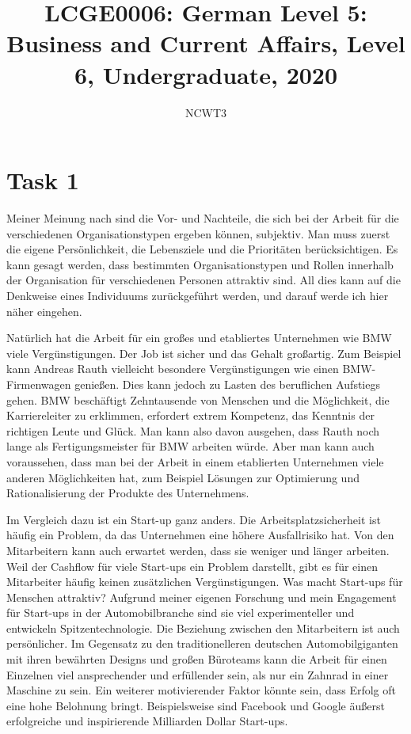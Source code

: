 \documentclass[11pt]{article}
\numberwithin{equation}{section}
\begin{document}
\title{\textbf{LCGE0006: German Level 5: Business and Current Affairs, Level 6, Undergraduate, 2020}}
\author{NCWT3}
\maketitle
\section*{Task 1}
Meiner Meinung nach sind die Vor- und Nachteile, die sich bei der Arbeit für die verschiedenen Organisationstypen ergeben können, subjektiv. Man muss zuerst die eigene Persönlichkeit, die Lebensziele und die Prioritäten berücksichtigen. Es kann gesagt werden, dass bestimmten Organisationstypen und Rollen innerhalb der Organisation für verschiedenen Personen attraktiv sind. All dies kann auf die Denkweise eines Individuums zurückgeführt werden, und darauf werde ich hier näher eingehen.

Natürlich hat die Arbeit für ein großes und etabliertes Unternehmen wie BMW viele Vergünstigungen. Der Job ist sicher und das Gehalt großartig. Zum Beispiel kann Andreas Rauth vielleicht besondere Vergünstigungen wie einen BMW-Firmenwagen genießen. Dies kann jedoch zu Lasten des beruflichen Aufstiegs gehen. BMW beschäftigt Zehntausende von Menschen und die Möglichkeit, die Karriereleiter zu erklimmen, erfordert extrem Kompetenz, das Kenntnis der richtigen Leute und Glück. Man kann also davon ausgehen, dass Rauth noch lange als Fertigungsmeister für BMW arbeiten würde. Aber man kann auch voraussehen, dass man bei der Arbeit in einem etablierten Unternehmen viele anderen Möglichkeiten hat, zum Beispiel Lösungen zur Optimierung und Rationalisierung der Produkte des Unternehmens.

Im Vergleich dazu ist ein Start-up ganz anders. Die Arbeitsplatzsicherheit ist häufig ein Problem, da das Unternehmen eine höhere Ausfallrisiko hat. Von den Mitarbeitern kann auch erwartet werden, dass sie weniger und länger arbeiten. Weil der Cashflow für viele Start-ups ein Problem darstellt, gibt es für einen Mitarbeiter häufig keinen zusätzlichen Vergünstigungen. Was macht Start-ups für Menschen attraktiv? Aufgrund meiner eigenen Forschung und mein Engagement für Start-ups in der Automobilbranche sind sie viel experimenteller und entwickeln Spitzentechnologie. Die Beziehung zwischen den Mitarbeitern ist auch persönlicher. Im Gegensatz zu den traditionelleren deutschen Automobilgiganten mit ihren bewährten Designs und großen Büroteams kann die Arbeit für einen Einzelnen viel ansprechender und erfüllender sein, als nur ein Zahnrad in einer Maschine zu sein. Ein weiterer motivierender Faktor könnte sein, dass Erfolg oft eine hohe Belohnung bringt. Beispielsweise sind Facebook und Google äußerst erfolgreiche und inspirierende Milliarden Dollar Start-ups.
\end{document}
